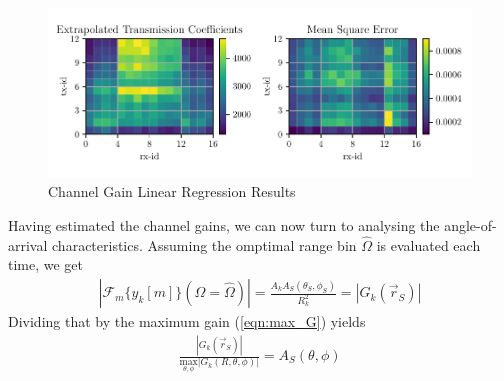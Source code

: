 \begin{figure}
    \centering
    \includegraphics[width=\textwidth]{../figures/amplitude_linreg.pdf}
    \caption{Channel Gain Linear Regression Results}
    \label{fig:amp_linreg}
\end{figure}

Having estimated the channel gains, we can now turn to analysing the angle-of-arrival characteristics.
Assuming the omptimal range bin $\hat \Omega$ is evaluated each time, we get
\begin{align}
    \left|\mathcal{F}_m\{y_k[m]\}(\Omega = \hat \Omega)  \right| =  \frac{A_kA_S(\theta_S,\phi_S)}{R_{k}^2} =  |G_k(\vec r_S)|
\end{align}
Dividing that by the maximum gain (\ref{eqn:max_G}) yields
\begin{align}
    \frac {|G_k(\vec r_S)|}{\underset{\theta,\phi}{\text{max}} |G_k(R,\theta,\phi)|}  = A_S(\theta,\phi)
\end{align}

